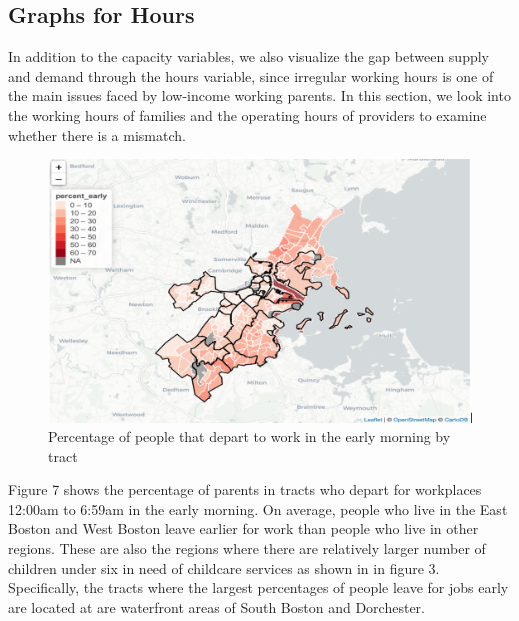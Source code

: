 \documentclass[10pt,letterpaper]{article}
\begin{document}
\subsection{Graphs for Hours}\label{graphs-for-hours}

In addition to the capacity variables, we also visualize the gap between
supply and demand through the hours variable, since irregular working
hours is one of the main issues faced by low-income working parents. In
this section, we look into the working hours of families and the
operating hours of providers to examine whether there is a mismatch.

\begin{figure}

{\centering \includegraphics[width=1\linewidth]{fig4} 

}

\caption{Percentage of people that depart to work in the early morning by tract}\label{fig:unnamed-chunk-9}
\end{figure}

Figure 7 shows the percentage of parents in tracts who depart for
workplaces 12:00am to 6:59am in the early morning. On average, people
who live in the East Boston and West Boston leave earlier for work than
people who live in other regions. These are also the regions where there
are relatively larger number of children under six in need of childcare
services as shown in in figure 3. Specifically, the tracts where the
largest percentages of people leave for jobs early are located at are
waterfront areas of South Boston and Dorchester.
\end{document}
